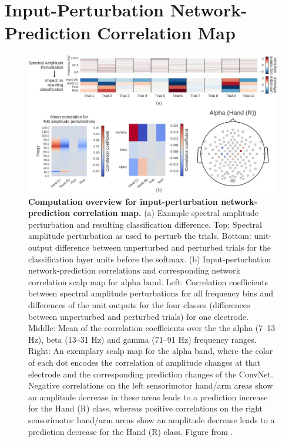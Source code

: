 \section{Input-Perturbation Network-Prediction Correlation
Map}\label{input-perturbation-network-prediction-correlation-map}


\begin{figure}[h!tb]
    \myfloatalign
    \includegraphics[width=1\linewidth]{images/input-perturbation-overview.png}
    \caption[Computation overview amplitude perturbation]{
\textbf{Computation overview for input-perturbation network-prediction
correlation map.} (a) Example spectral amplitude perturbation and
resulting classification difference. Top: Spectral amplitude
perturbation as used to perturb the trials. Bottom: unit-output
difference between unperturbed and perturbed trials for the
classification layer units before the softmax. (b) Input-perturbation
network-prediction correlations and corresponding network correlation
scalp map for alpha band. Left: Correlation coefficients between
spectral amplitude perturbations for all frequency bins and differences
of the unit outputs for the four classes (differences between
unperturbed and perturbed trials) for one electrode. Middle: Mean of the
correlation coefficients over the the alpha (7--13 Hz), beta (13--31 Hz)
and gamma (71--91 Hz) frequency ranges. Right: An exemplary scalp map
for the alpha band, where the color of each dot encodes the correlation
of amplitude changes at that electrode and the corresponding prediction
changes of the ConvNet. Negative correlations on the left sensorimotor
hand/arm areas show an amplitude decrease in these areas leads to a
prediction increase for the Hand (R) class, whereas positive
correlations on the right sensorimotor hand/arm areas show an amplitude
decrease leads to a prediction decrease for the Hand (R) class. Figure
from \cite{schirrmeisterdeephbm2017}.
}
\label{input-perturbation-overview-figure}
\end{figure}

